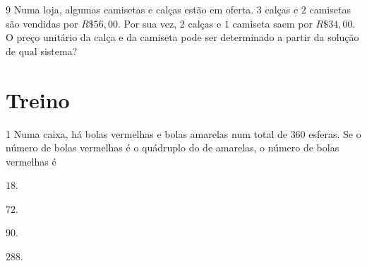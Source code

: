 \num{9} Numa loja, algumas camisetas e calças estão em oferta. $3$ calças e $2$
camisetas são vendidas por $R\$ 56,00$. Por sua vez, $2$ calças e $1$ camiseta
saem por $R\$ 34,00$. O preço unitário da calça e da camiseta pode ser
determinado a partir da solução de qual sistema?

\begin{mdframed}[linewidth=2pt,linecolor=white,roundcorner=10pt]

\vspace{6cm}
\end{mdframed}

\section*{Treino}

\num{1}  Numa caixa, há bolas vermelhas e bolas amarelas num total de $360$
esferas. Se o número de bolas vermelhas é o quádruplo do de amarelas, o
número de bolas vermelhas é

\begin{escolha}
\item $18$.
\item $72$.
\item $90$.
\item $288$.
\end{escolha}



